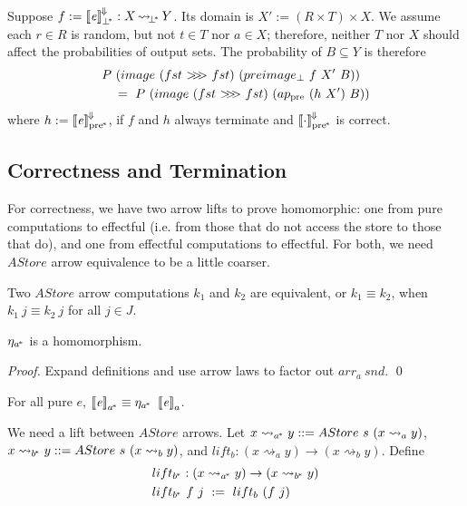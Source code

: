 \documentclass{llncs}
\newcommand{\arrow}{\rightsquigarrow}
\newcommand{\conv}{^{\mspace{-2mu}\Downarrow\mspace{-2mu}}}
\newcommand{\meaningofconv}[1]{\left\llbracket{#1}\right\rrbracket\conv}
\newcommand{\acomp}{\ensuremath{{>}\mspace{-6mu}{>}\mspace{-6mu}{>}}}
\newcommand{\gen}{_a}
\newcommand{\genb}{_b}
\newcommand{\genc}{_{a^{\mspace{-2mu}*}}}
\newcommand{\gend}{_{b^{\mspace{-2mu}*}}}
\newcommand{\pbot}{{\bot^{\mspace{-4mu}*}}}
\newcommand{\pre}{_\mathrm{pre}}
\newcommand{\ppre}{_\mathrm{pre^{\mspace{-2mu}*}}}
\DeclareMathOperator{\pbotto}{{\arrow\mspace{-3mu}}_\pbot}
\begin{document}
Suppose $f := \meaningofconv{\mathit{e}}_\pbot : X \pbotto Y$.
Its domain is $X' := (R \times T) \times X$.
We assume each $r \in R$ is random, but not $t \in T$ nor $a \in X$; therefore, neither $T$ nor $X$ should affect the probabilities of output sets.
The probability of $B \subseteq Y$ is therefore
\begin{equation}
\begin{aligned}
	&P~(image~(fst~\acomp~fst)~(preimage_\bot~f~X'~B)) \\
	&\tab =\ P~(image~(fst~\acomp~fst)~(ap\pre~(h~X')~B))
\end{aligned}
\end{equation}
where $h := \meaningofconv{\mathit{e}}\ppre$, if $f$ and $h$ always terminate and $\meaningofconv{\cdot}\ppre$ is correct.

\subsection{Correctness and Termination}

For correctness, we have two arrow lifts to prove homomorphic: one from pure computations to effectful (i.e. from those that do not access the store to those that do), and one from effectful computations to effectful.
For both, we need $AStore$ arrow equivalence to be a little coarser.

\begin{definition}
Two $AStore$ arrow computations $k_1$ and $k_2$ are equivalent, or $k_1 \equiv k_2$, when $k_1~j \equiv k_2~j$ for all $j \in J$.
\end{definition}

\begin{theorem}
$\eta\genc$ is a homomorphism.
\end{theorem}
\begin{proof}
Expand definitions and use arrow laws to factor out $arr\gen~snd$.
\qed
\end{proof}

\begin{corollary}
\label{cor:pure-astore-semantic-correctness}
For all pure $\mathit{e}$, $\meaningof{\mathit{e}}\genc \equiv \eta\genc~\meaningof{\mathit{e}}\gen$.
\end{corollary}

We need a lift between $AStore$ arrows.
Let $x \arrow\genc y ::= AStore~s~(x \arrow\gen y)$, $x \arrow\gend y ::= AStore~s~(x \arrow\genb y)$, and $lift\genb : (x \arrow\gen y) \to (x \arrow\genb y)$.
Define
\begin{equation}
\begin{aligned}
	&lift\gend : (x \arrow\genc y) \to (x \arrow\gend y) \\
	&lift\gend~f~j \ := \ lift\genb~(f~j)
\end{aligned}
\end{equation}
\end{document}
